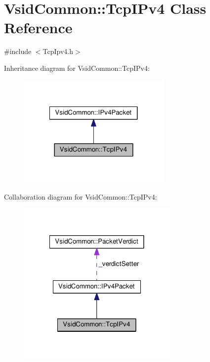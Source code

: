 \hypertarget{class_vsid_common_1_1_tcp_i_pv4}{\section{Vsid\-Common\-:\-:Tcp\-I\-Pv4 Class Reference}
\label{class_vsid_common_1_1_tcp_i_pv4}
}


{\ttfamily \#include $<$Tcp\-Ipv4.\-h$>$}



Inheritance diagram for Vsid\-Common\-:\-:Tcp\-I\-Pv4\-:
\nopagebreak
\begin{figure}[H]
\begin{center}
\leavevmode
\includegraphics[width=212pt]{class_vsid_common_1_1_tcp_i_pv4__inherit__graph}
\end{center}
\end{figure}


Collaboration diagram for Vsid\-Common\-:\-:Tcp\-I\-Pv4\-:
\nopagebreak
\begin{figure}[H]
\begin{center}
\leavevmode
\includegraphics[width=222pt]{class_vsid_common_1_1_tcp_i_pv4__coll__graph}
\end{center}
\end{figure}
